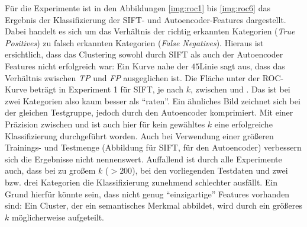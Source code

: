 

Für die Experimente ist in den Abbildungen \ref{img:roc1} bis \ref{img:roc6} das Ergebnis der Klassifizierung der SIFT- und Autoencoder-Features dargestellt. Dabei handelt es sich um das Verhältnis der richtig erkannten Kategorien (\textit{True Positives}) zu falsch erkannten Kategorien (\textit{False Negatives}). Hieraus ist ersichtlich, dass das Clustering sowohl durch SIFT als auch der Autoencoder Features nicht erfolgreich war: Ein Kurve nahe der $45$\degree  Linie sagt aus, dass das Verhältnis zwischen \textit{TP} und \textit{FP} ausgeglichen ist. Die Fläche unter der ROC-Kurve beträgt in Experiment 1 für SIFT, je nach $k$, zwischen  und . Das ist bei zwei Kategorien also kaum besser als \enquote{raten}. Ein ähnliches Bild zeichnet sich bei der gleichen Testgruppe, jedoch durch den Autoencoder komprimiert. Mit einer Präzision zwischen  und  ist auch hier für kein gewähltes $k$ eine erfolgreiche Klassifizierung durchgeführt worden.\newline
Auch bei Verwendung einer größeren Trainings- und Testmenge (Abbildung  für SIFT,  für den Autoencoder) verbessern sich die Ergebnisse nicht nennenswert. 
Auffallend ist durch alle Experimente auch, dass bei zu großem $k$ ($> 200$), bei den vorliegenden Testdaten und zwei bzw. drei Kategorien die Klassifizierung zunehmend schlechter ausfällt. Ein Grund hierfür könnte sein, dass nicht genug \enquote{einzigartige} Features vorhanden sind: Ein Cluster, der ein semantisches Merkmal abbildet, wird durch ein größeres $k$ möglicherweise aufgeteilt.

